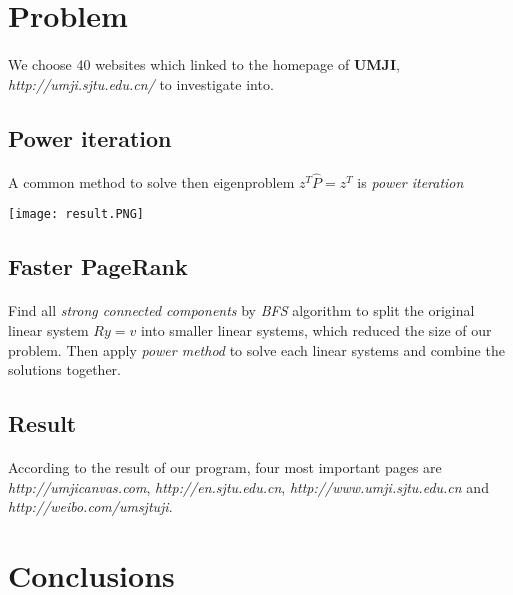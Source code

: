 \documentclass[a0,portrait]{a0poster}
\begin{document}
\begin{multicols}{2}
\color{purple}
\section*{Problem}
\paragraph{}
   We choose 40 websites which linked to the homepage of \textbf{UMJI}, \textit{http://umji.sjtu.edu.cn/} to investigate into.
   \subsection*{Power iteration}
   \paragraph{}
   A common method to solve then eigenproblem $z^{T}\hat{P} = z^T$ is \textit{power iteration}\\
  \begin{minipage}[H]{1\linewidth}
  	\centering
  	\texttt{[image: result.PNG]}
  	\label{Table 1}
  \end{minipage}
   \subsection*{Faster PageRank}
   \paragraph{}
   Find all \textit{strong connected components} by \textit{BFS} algorithm to split the original linear system $Ry=v$ into smaller linear systems, which reduced the size of our problem. Then apply \textit{power method} to solve each linear systems and combine the solutions together.
  \subsection*{Result}
  \paragraph{}
  According to the result of our program, four most important pages are \textit{http://umjicanvas.com}, \textit{http://en.sjtu.edu.cn}, \textit{http://www.umji.sjtu.edu.cn} and \textit{http://weibo.com/umsjtuji}.   

\color{teal}
\section*{Conclusions}

\end{multicols}
\end{document}
